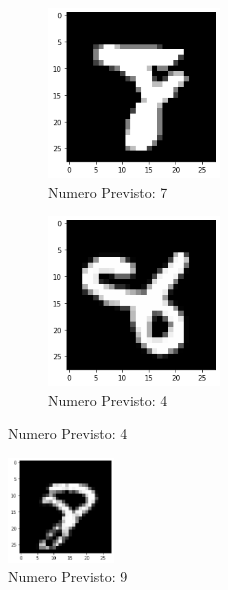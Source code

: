 \documentclass[12pt, a4paper]{article}
\begin{document}
\begin{figure}[H]
    \begin{subfigure}{.5\textwidth}
        \centering
        \caption{Numero Previsto: 7}
        \includegraphics[width=0.50\textwidth]{otto3.png}
    \end{subfigure} %
    \begin{subfigure}{.5\textwidth}
        \centering
        \caption{Numero Previsto: 4}
        \includegraphics[width=0.50\textwidth]{otto4.png}
    \end{subfigure} 
\end{figure}

\begin{figure}[H]
    \centering
    \caption{Numero Previsto: 9}
    \includegraphics[width=0.25\textwidth]{otto5.png}
\end{figure} 
\end{document}
